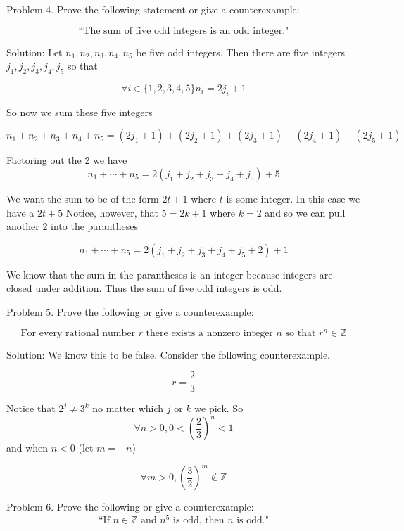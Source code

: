 \documentclass[16 pt]{amsart}
\theoremstyle{definition}
\theoremstyle{remark}
\numberwithin{equation}{subsection}
\newcommand{\Z}{\mathbb{Z}}
\begin{document}
Problem 4. Prove the following statement or give a counterexample:

\[
\text{``The sum of five odd integers is an odd integer."}
\]

\vspace{1in}

Solution: Let $n_1,n_2,n_3,n_4,n_5$ be five odd integers.  Then there are five integers $j_1,j_2,j_3,j_4,j_5$ so that

\[
\forall i \in \{1,2,3,4,5\} n_i = 2j_i+1
\]


So now we sum these five integers

\[
n_1+n_2+n_3+n_4+n_5 = (2j_1+1) + (2j_2+1) + (2j_3+1) + (2j_4+1) + (2j_5+1)
\]

Factoring out the 2 we have
\[
n_1+\cdots + n_5 = 2(j_1+j_2+j_3+j_4+j_5) + 5
\]

We want the sum to be of the form $2t+1$ where $t$ is some integer.  In this case we have a $2t+5$ Notice, however, that $5= 2k+1$ where $k=2$ and so we can pull another 2 into the parantheses

\[
n_1+\cdots + n_5 = 2(j_1+j_2+j_3+j_4+j_5+2)+1
\]

We know that the sum in the parantheses is an integer because integers are closed under addition.
Thus the sum of five odd integers is odd.


\newpage

Problem 5. Prove the following or give a counterexample:

\[
\text{For every rational number } r \text{ there exists a nonzero integer } n \text{ so that } r^n \in \Z
\]


\vspace{1in}

Solution: We know this to be false.  Consider the following counterexample.

\[
r= \frac{2}{3}
\]

Notice that $2^j \ne 3^k$ no matter which $j$ or $k$ we pick.  So
\[
\forall n>0, 0<\left(\frac{2}{3}\right)^n <1 
\] 
and when $n<0$ (let $m=-n$)

\[
\forall m>0, \left(\frac{3}{2}\right)^m \notin \Z
\]



\newpage

Problem 6. Prove the following or give a counterexample:
\[
\text{``If } n\in\Z \text{ and } n^5 \text{ is odd, then  } n \text{ is odd."} 
\]

\vspace{1in}
\end{document}
